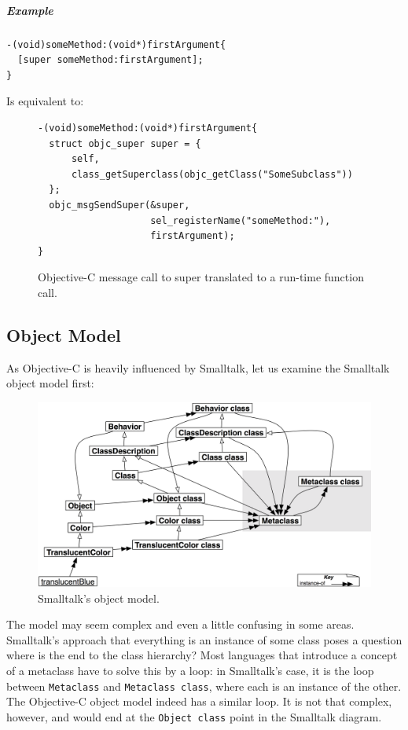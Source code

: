 \subparagraph{Example}

\begin{verbatim}
-(void)someMethod:(void*)firstArgument{
  [super someMethod:firstArgument];
}
\end{verbatim}

Is equivalent to:

\begin{figure}[H]
\begin{verbatim}
-(void)someMethod:(void*)firstArgument{
  struct objc_super super = { 
      self, 
      class_getSuperclass(objc_getClass("SomeSubclass")) 
  };
  objc_msgSendSuper(&super, 
                    sel_registerName("someMethod:"), 
                    firstArgument);
}
\end{verbatim}
\centering{}
  \caption{Objective-C message call to super translated to a run-time function call.}
  \label{fig:methods_translated_to_objcMsgSendSuper}
\end{figure}

\subsection{Object Model}

As Objective-C is heavily influenced by Smalltalk, let us examine the Smalltalk object model first\cite{smalltalk_class_diagram}:

\begin{figure}[H]
\includegraphics[width=120mm]{./img/smalltalk_class_hierarchy.png}
  \centering{}
  \caption{Smalltalk's object model.}
  \label{fig:smalltalk_obj_model}
\end{figure}

The model may seem complex and even a little confusing in some areas. Smalltalk's approach that everything is an instance of some class poses a question where is the end to the class hierarchy? Most languages that introduce a concept of a metaclass have to solve this by a loop: in Smalltalk's case, it is the loop between \verb=Metaclass= and \verb=Metaclass class=, where each is an instance of the other. The Objective-C object model indeed has a similar loop. It is not that complex, however, and would end at the \verb=Object class= point in the Smalltalk diagram.

